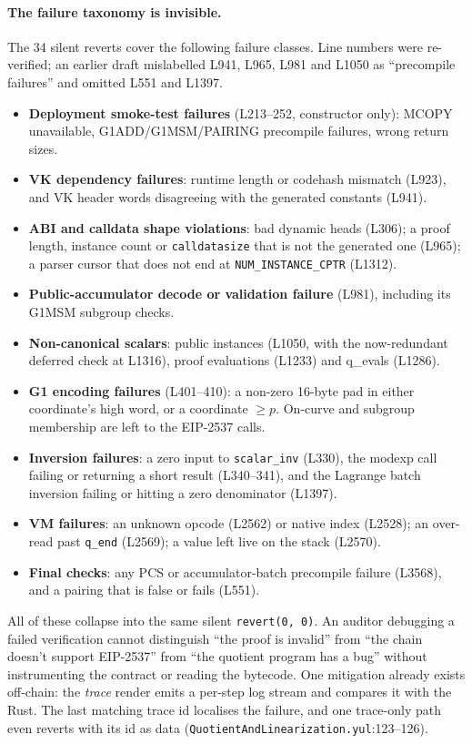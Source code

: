 \paragraph{The failure taxonomy is invisible.} 
The 34 silent reverts cover the following failure classes. Line
numbers were re-verified; an earlier draft mislabelled L941, L965,
L981 and L1050 as ``precompile failures'' and omitted L551 and
L1397.
\begin{itemize}
\item \textbf{Deployment smoke-test failures} (L213--252,
  constructor only): MCOPY unavailable, G1ADD/G1MSM/PAIRING
  precompile failures, wrong return sizes.
\item \textbf{VK dependency failures}: runtime length or codehash
  mismatch (L923), and VK header words disagreeing with the
  generated constants (L941).
\item \textbf{ABI and calldata shape violations}: bad dynamic heads
  (L306); a proof length, instance count or \texttt{calldatasize}
  that is not the generated one (L965); a parser cursor that does
  not end at \texttt{NUM\_\allowbreak{}INSTANCE\_\allowbreak{}CPTR} (L1312).
\item \textbf{Public-accumulator decode or validation failure}
  (L981), including its G1MSM subgroup checks.
\item \textbf{Non-canonical scalars}: public instances (L1050, with
  the now-redundant deferred check at L1316), proof evaluations
  (L1233) and q\_evals (L1286).
\item \textbf{G1 encoding failures} (L401--410): a non-zero
  16-byte pad in either coordinate's high word, or a coordinate
  $\ge p$. On-curve and subgroup membership are left to the
  EIP-2537 calls.
\item \textbf{Inversion failures}: a zero input to
  \texttt{scalar\_inv} (L330), the modexp call failing or returning
  a short result (L340--341), and the Lagrange batch inversion failing
  or hitting a zero denominator (L1397).
\item \textbf{VM failures}: an unknown opcode (L2562) or native
  index (L2528); an over-read past \texttt{q\_end} (L2569); a value
  left live on the stack (L2570).
\item \textbf{Final checks}: any PCS or accumulator-batch precompile
  failure (L3568), and a pairing that is false or fails (L551).
\end{itemize}

All of these collapse into the same silent \texttt{revert(0, 0)}.
An auditor debugging a failed verification cannot distinguish ``the
proof is invalid'' from ``the chain doesn't support EIP-2537'' from
``the quotient program has a bug'' without instrumenting the
contract or reading the bytecode. One mitigation already exists
off-chain: the \emph{trace} render emits a per-step log stream and
compares it with the Rust. The last matching trace id localises the
failure, and one trace-only path even reverts with its id as data
(\texttt{QuotientAndLinearization.yul}:123--126).

